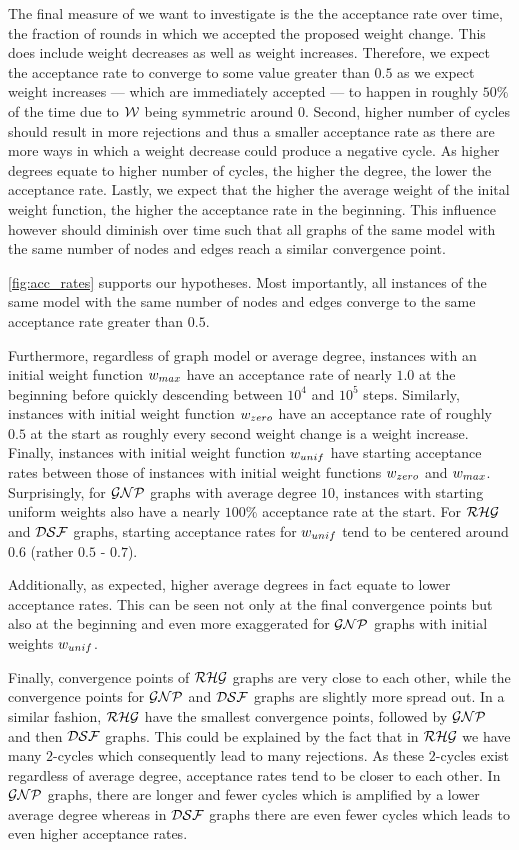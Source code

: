The final measure of \algsl we want to investigate is the the acceptance rate over time, \ie the fraction of rounds in which we accepted the proposed weight change.
This does include weight decreases as well as weight increases.
Therefore, we expect the acceptance rate to converge to some value greater than $0.5$ as we expect weight increases --- which are immediately accepted --- to happen in roughly $50\%$ of the time due to $\mathcal W$ being symmetric around $0$.
Second, higher number of cycles should result in more rejections and thus a smaller acceptance rate as there are more ways in which a weight decrease could produce a negative cycle.
As higher degrees equate to higher number of cycles, the higher the degree, the lower the acceptance rate.
Lastly, we expect that the higher the average weight of the inital weight function, the higher the acceptance rate in the beginning.
This influence however should diminish over time such that all graphs of the same model with the same number of nodes and edges reach a similar convergence point.

\cref{fig:acc_rates} supports our hypotheses.
Most importantly, all instances of the same model with the same number of nodes and edges converge to the same acceptance rate greater than $0.5$.

Furthermore, regardless of graph model or average degree, instances with an initial weight function $w_{max}$ have an acceptance rate of nearly $1.0$ at the beginning before quickly descending between $10^4$ and $10^5$ steps.
Similarly, instances with initial weight function $w_{zero}$ have an acceptance rate of roughly $0.5$ at the start as roughly every second weight change is a weight increase.
Finally, instances with initial weight function $w_{unif}$ have starting acceptance rates between those of instances with initial weight functions $w_{zero}$ and $w_{max}$.
Surprisingly, for $\mathcal{GNP}$ graphs with average degree $10$, instances with starting uniform weights also have a nearly $100\%$ acceptance rate at the start.
For $\mathcal{RHG}$ and $\mathcal{DSF}$ graphs, starting acceptance rates for $w_{unif}$ tend to be centered around $0.6$ (rather $0.5$ - $0.7$).

Additionally, as expected, higher average degrees in fact equate to lower acceptance rates.
This can be seen not only at the final convergence points but also at the beginning and even more exaggerated for $\mathcal{GNP}$ graphs with initial weights $w_{unif}$. 

Finally, convergence points of $\mathcal{RHG}$ graphs are very close to each other, while the convergence points for $\mathcal{GNP}$ and $\mathcal{DSF}$ graphs are slightly more spread out.
In a similar fashion, $\mathcal{RHG}$ have the smallest convergence points, followed by $\mathcal{GNP}$ and then $\mathcal{DSF}$ graphs.
This could be explained by the fact that in $\mathcal{RHG}$ we have many $2$-cycles which consequently lead to many rejections.
As these $2$-cycles exist regardless of average degree, acceptance rates tend to be closer to each other.
In $\mathcal{GNP}$ graphs, there are longer and fewer cycles which is amplified by a lower average degree whereas in $\mathcal{DSF}$ graphs there are even fewer cycles which leads to even higher acceptance rates.

